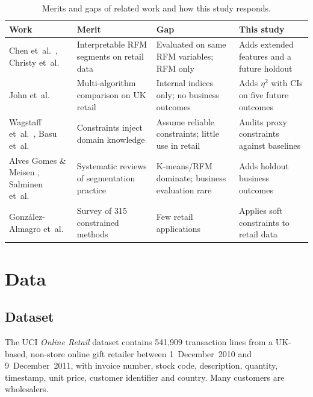 \documentclass[conference,10pt]{IEEEtran}
\newcommand{\etasq}{\eta^{2}}
\begin{document}
\begin{table}[t]
\centering
\caption{Merits and gaps of related work and how this study responds.}
\label{tab:litgap}
\footnotesize
\setlength{\tabcolsep}{3pt}
\begin{tabular}{L{1.55cm}L{2.05cm}L{2.05cm}L{1.85cm}}
\toprule
\textbf{Work} & \textbf{Merit} & \textbf{Gap} & \textbf{This study}\\
\midrule
Chen et~al.\ \cite{chen2012rfm}, Christy et~al.\ \cite{christy2021rfm}
& Interpretable RFM segments on retail data
& Evaluated on same RFM variables; RFM only
& Adds extended features and a future holdout\\
\addlinespace
John et~al.\ \cite{john2023exploration}
& Multi-algorithm comparison on UK retail
& Internal indices only; no business outcomes
& Adds $\etasq$ with CIs on five future outcomes\\
\addlinespace
Wagstaff et~al.\ \cite{wagstaff2001constrained}, Basu et~al.\ \cite{basu2004probabilistic}
& Constraints inject domain knowledge
& Assume reliable constraints; little use in retail
& Audits proxy constraints against baselines\\
\addlinespace
Alves Gomes \& Meisen \cite{gomes2023review}, Salminen et~al.\ \cite{salminen2023algorithms}
& Systematic reviews of segmentation practice
& K-means/RFM dominate; business evaluation rare
& Adds holdout business outcomes\\
\addlinespace
Gonz\'alez-Almagro et~al.\ \cite{gonzalez2025semi}
& Survey of 315 constrained methods
& Few retail applications
& Applies soft constraints to retail data\\
\bottomrule
\end{tabular}
\end{table}

\section{Data}
\label{sec:data}

\subsection{Dataset}
The UCI \emph{Online Retail} dataset \cite{uci2015onlineretail} contains
541,909 transaction lines from a UK-based, non-store online gift retailer
between 1~December~2010 and 9~December~2011, with invoice number, stock
code, description, quantity, timestamp, unit price, customer identifier and
country. Many customers are wholesalers.
\end{document}
